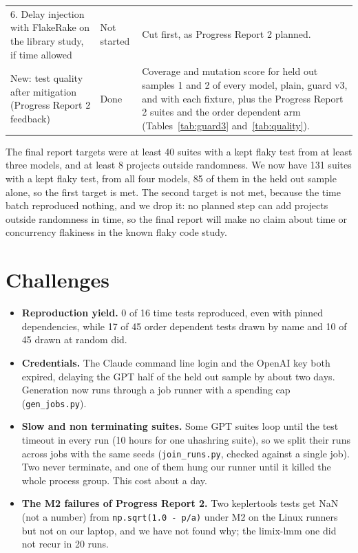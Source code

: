 \documentclass[sigconf,nonacm]{acmart}
\begin{document}
\begin{table}[t]
\begin{tabularx}{\textwidth}{p{5.6cm}p{1.6cm}X}
6. Delay injection with FlakeRake on the library study, if time allowed & Not started & Cut first, as Progress Report 2 planned. \\
New: test quality after mitigation (Progress Report 2 feedback) & Done & Coverage and mutation score for held out samples 1 and 2 of every model, plain, guard v3, and with each fixture, plus the Progress Report 2 suites and the order dependent arm (Tables~\ref{tab:guard3} and~\ref{tab:quality}). \\
\bottomrule
\end{tabularx}
\end{table}

The final report targets were at least 40 suites with a kept flaky test from at least three models, and at least 8 projects outside randomness. We now have 131 suites with a kept flaky test, from all four models, 85 of them in the held out sample alone, so the first target is met. The second target is not met, because the time batch reproduced nothing, and we drop it: no planned step can add projects outside randomness in time, so the final report will make no claim about time or concurrency flakiness in the known flaky code study.







\section{Challenges}
\label{sec:challenges3}
\begin{itemize}
\item \textbf{Reproduction yield.} 0 of 16 time tests reproduced, even with pinned dependencies, while 17 of 45 order dependent tests drawn by name and 10 of 45 drawn at random did.
\item \textbf{Credentials.} The Claude command line login and the OpenAI key both expired, delaying the GPT half of the held out sample by about two days. Generation now runs through a job runner with a spending cap (\texttt{gen\_jobs.py}).
\item \textbf{Slow and non terminating suites.} Some GPT suites loop until the test timeout in every run (10 hours for one uhashring suite), so we split their runs across jobs with the same seeds (\texttt{join\_runs.py}, checked against a single job). Two never terminate, and one of them hung our runner until it killed the whole process group. This cost about a day.
\item \textbf{The M2 failures of Progress Report 2.} Two keplertools tests get NaN (not a number) from \texttt{np.sqrt(1.0 - p/a)} under M2 on the Linux runners but not on our laptop, and we have not found why; the limix-lmm one did not recur in 20 runs.
\end{itemize}
\end{document}
